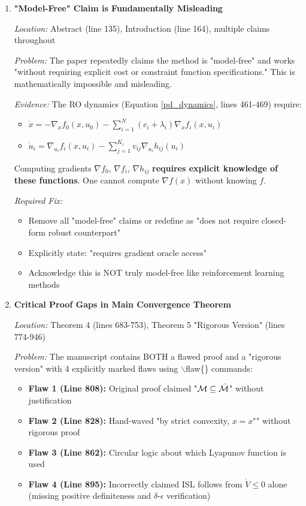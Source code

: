 \documentclass[journal,twoside,web]{ieeecolor}
\begin{document}
\begin{enumerate}

\item \textbf{"Model-Free" Claim is Fundamentally Misleading}

\textit{Location:} Abstract (line 135), Introduction (line 164), multiple claims throughout

\textit{Problem:} The paper repeatedly claims the method is "model-free" and works "without requiring explicit cost or constraint function specifications." This is mathematically impossible and misleading.

\textit{Evidence:} The RO dynamics (Equation \ref{pd_dynamics}, lines 461-469) require:
\begin{itemize}
\item $\dot x=-\nabla_x f_0(x,u_0)- \sum_{i=1}^N(c_i+\lambda_i) \nabla_x f_i(x,u_i)$
\item $\dot u_i=\nabla_{u_i}f_i(x,u_i)- \sum_{j=1}^{K_i} v_{ij} \nabla_{u_i} h_{ij}(u_i)$
\end{itemize}

Computing gradients $\nabla f_0$, $\nabla f_i$, $\nabla h_{ij}$ \textbf{requires explicit knowledge of these functions}. One cannot compute $\nabla f(x)$ without knowing $f$.

\textit{Required Fix:}
\begin{itemize}
\item Remove all "model-free" claims or redefine as "does not require closed-form robust counterpart"
\item Explicitly state: "requires gradient oracle access"
\item Acknowledge this is NOT truly model-free like reinforcement learning methods
\end{itemize}

\item \textbf{Critical Proof Gaps in Main Convergence Theorem}

\textit{Location:} Theorem 4 (lines 683-753), Theorem 5 "Rigorous Version" (lines 774-946)

\textit{Problem:} The manuscript contains BOTH a flawed proof and a "rigorous version" with 4 explicitly marked flaws using $\backslash$flaw\{\} commands:

\begin{itemize}
\item \textbf{Flaw 1 (Line 808):} Original proof claimed "${\cal M}\subseteq \bar{\cal M}$" without justification
\item \textbf{Flaw 2 (Line 828):} Hand-waved "by strict convexity, $x=x^\star$" without rigorous proof
\item \textbf{Flaw 3 (Line 862):} Circular logic about which Lyapunov function is used
\item \textbf{Flaw 4 (Line 895):} Incorrectly claimed ISL follows from $\dot{V}\leq 0$ alone (missing positive definiteness and $\delta$-$\epsilon$ verification)
\end{itemize}


\end{enumerate}
\end{document}
